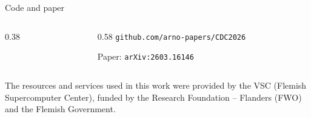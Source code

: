 \documentclass[aspectratio=169]{beamer}
\begin{document}
\begin{frame}{Code and paper}
  \begin{columns}[c]
  \begin{column}{0.38\textwidth}
    \begin{center}
    \end{center}
  \end{column}
  \begin{column}{0.58\textwidth}
    \small
    \texttt{github.com/arno-papers/CDC2026}

    \vspace{1.0em}
    Paper: \texttt{arXiv:2603.16146}
  \end{column}
  \end{columns}

  \vspace{1.0em}
  {\footnotesize The resources and services used in this work were provided by the VSC (Flemish
  Supercomputer Center), funded by the Research Foundation -- Flanders (FWO) and the Flemish Government.}
\end{frame}
\end{document}
